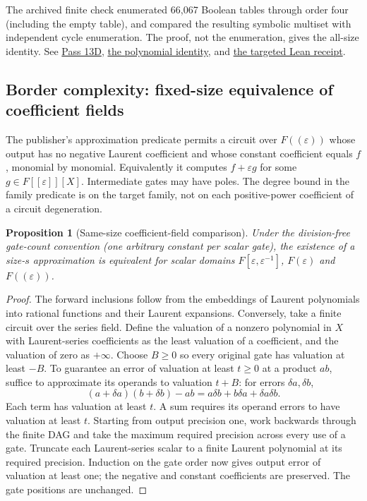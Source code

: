 \documentclass[11pt,letterpaper]{article}
\newtheorem{proposition}[theorem]{Proposition}
\theoremstyle{definition}\newtheorem{definition}[theorem]{Definition}\newtheorem{example}[theorem]{Example}
\theoremstyle{remark}\newtheorem{remark}[theorem]{Remark}
\newcommand{\pub}[3]{\href{https://github.com/anthropics/formal-math/blob/11b6c7e3c927df2658f513b6b68ea7f8929c62c5/vp-vnp/#1\#L#2}{#3}}
\newcommand{\aud}[2]{\href{https://github.com/nousentllc/VP-VNP-Review/blob/567303d0bcf4f9d54390437b137752446e58ccd6/#1}{#2}}
\begin{document}
The archived finite check enumerated 66,067 Boolean tables through order four (including the empty table), and compared the resulting symbolic multiset with independent cycle enumeration. The proof, not the enumeration, gives the all-size identity. See \aud{passes/pass13D-membership.md}{Pass 13D}, \pub{Nc/Hc/Vnp.lean}{189}{the polynomial identity}, and \aud{checks/pass13d_membership_replay.json}{the targeted Lean receipt}.

\subsection{Border complexity: fixed-size equivalence of coefficient fields}\label{sec:border}
The publisher's approximation predicate permits a circuit over $F((\varepsilon))$ whose output has no negative Laurent coefficient and whose constant coefficient equals $f$, monomial by monomial. Equivalently it computes $f+\varepsilon g$ for some $g\in F[[\varepsilon]][X]$. Intermediate gates may have poles. The degree bound in the family predicate is on the target family, not on each positive-power coefficient of a circuit degeneration.
\begin{proposition}[Same-size coefficient-field comparison]\label{prop:border}
Under the division-free gate-count convention (one arbitrary constant per scalar gate), the existence of a size-$s$ approximation is equivalent for scalar domains $F[\varepsilon,\varepsilon^{-1}]$, $F(\varepsilon)$ and $F((\varepsilon))$.
\end{proposition}
\begin{proof}
The forward inclusions follow from the embeddings of Laurent polynomials into rational functions and their Laurent expansions. Conversely, take a finite circuit over the series field. Define the valuation of a nonzero polynomial in $X$ with Laurent-series coefficients as the least valuation of a coefficient, and the valuation of zero as $+\infty$. Choose $B\ge0$ so every original gate has valuation at least $-B$. To guarantee an error of valuation at least $t\ge0$ at a product $ab$, suffice to approximate its operands to valuation $t+B$: for errors $\delta a,\delta b$,
\[
 (a+\delta a)(b+\delta b)-ab=a\delta b+b\delta a+\delta a\delta b.
\]
Each term has valuation at least $t$. A sum requires its operand errors to have valuation at least $t$. Starting from output precision one, work backwards through the finite DAG and take the maximum required precision across every use of a gate. Truncate each Laurent-series scalar to a finite Laurent polynomial at its required precision. Induction on the gate order now gives output error of valuation at least one; the negative and constant coefficients are preserved. The gate positions are unchanged.
\end{proof}
\end{document}
